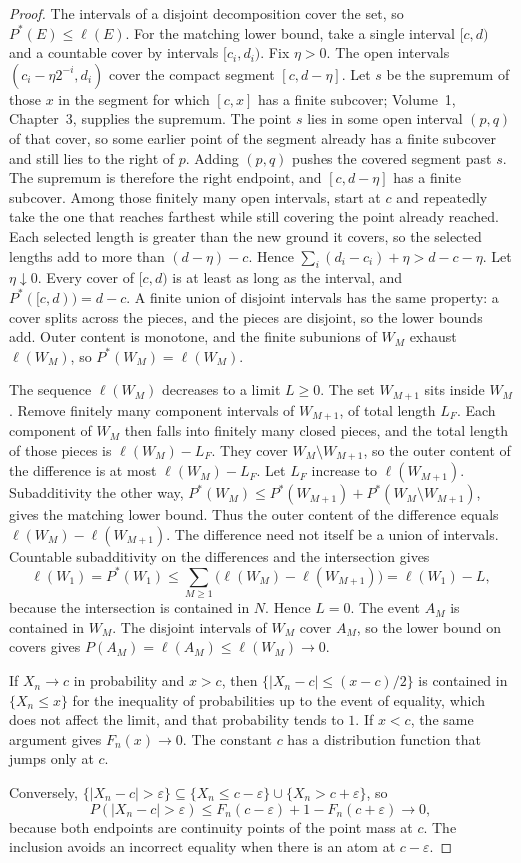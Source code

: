 \begin{proof}
The intervals of a disjoint decomposition cover the set, so $P^*(E)\le\ell(E)$. For the matching lower bound, take a single interval $[c,d)$ and a countable cover by intervals $[c_i,d_i)$. Fix $\eta>0$. The open intervals $(c_i-\eta 2^{-i},d_i)$ cover the compact segment $[c,d-\eta]$. Let $s$ be the supremum of those $x$ in the segment for which $[c,x]$ has a finite subcover; Volume~1, Chapter~3, supplies the supremum. The point $s$ lies in some open interval $(p,q)$ of that cover, so some earlier point of the segment already has a finite subcover and still lies to the right of $p$. Adding $(p,q)$ pushes the covered segment past $s$. The supremum is therefore the right endpoint, and $[c,d-\eta]$ has a finite subcover. Among those finitely many open intervals, start at $c$ and repeatedly take the one that reaches farthest while still covering the point already reached. Each selected length is greater than the new ground it covers, so the selected lengths add to more than $(d-\eta)-c$. Hence $\sum_i(d_i-c_i)+\eta>d-c-\eta$. Let $\eta\downarrow0$. Every cover of $[c,d)$ is at least as long as the interval, and $P^*([c,d))=d-c$. A finite union of disjoint intervals has the same property: a cover splits across the pieces, and the pieces are disjoint, so the lower bounds add. Outer content is monotone, and the finite subunions of $W_M$ exhaust $\ell(W_M)$, so $P^*(W_M)=\ell(W_M)$.

The sequence $\ell(W_M)$ decreases to a limit $L\ge0$. The set $W_{M+1}$ sits inside $W_M$. Remove finitely many component intervals of $W_{M+1}$, of total length $L_F$. Each component of $W_M$ then falls into finitely many closed pieces, and the total length of those pieces is $\ell(W_M)-L_F$. They cover $W_M\setminus W_{M+1}$, so the outer content of the difference is at most $\ell(W_M)-L_F$. Let $L_F$ increase to $\ell(W_{M+1})$. Subadditivity the other way, $P^*(W_M)\le P^*(W_{M+1})+P^*(W_M\setminus W_{M+1})$, gives the matching lower bound. Thus the outer content of the difference equals $\ell(W_M)-\ell(W_{M+1})$. The difference need not itself be a union of intervals. Countable subadditivity on the differences and the intersection gives
\[
 \ell(W_1)=P^*(W_1)\le\sum_{M\ge1}\bigl(\ell(W_M)-\ell(W_{M+1})\bigr)=\ell(W_1)-L,
\]
because the intersection is contained in $N$. Hence $L=0$. The event $A_M$ is contained in $W_M$. The disjoint intervals of $W_M$ cover $A_M$, so the lower bound on covers gives $P(A_M)=\ell(A_M)\le\ell(W_M)\to0$.

If $X_n\to c$ in probability and $x>c$, then $\{|X_n-c|\le(x-c)/2\}$ is contained in $\{X_n\le x\}$ for the inequality of probabilities up to the event of equality, which does not affect the limit, and that probability tends to $1$. If $x<c$, the same argument gives $F_n(x)\to0$. The constant $c$ has a distribution function that jumps only at $c$.

Conversely, $\{|X_n-c|>\varepsilon\}\subseteq\{X_n\le c-\varepsilon\}\cup\{X_n>c+\varepsilon\}$, so
\[
P(|X_n-c|>\varepsilon)\le F_n(c-\varepsilon)+1-F_n(c+\varepsilon)\to0,
\]
because both endpoints are continuity points of the point mass at $c$. The inclusion avoids an incorrect equality when there is an atom at $c-\varepsilon$.
\end{proof}

